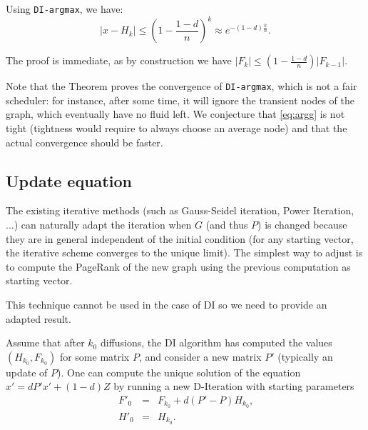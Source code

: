 \documentclass{llncs}
\begin{document}
\begin{theorem}
\label{thm:argmax}
Using \texttt{DI-argmax}, we have: 
\begin{equation}\label{eq:argg}
|x - H_k| \leq  \left(1-\frac{1-d}{n}\right)^k \approx e^{-(1-d)\frac k n}\text{.}
\end{equation}

\end{theorem}

The proof is immediate, as by construction we have $ |F_k|\leq (1-\frac{1-d}{n})|F_{k-1}| $.

Note that the Theorem proves the convergence of \texttt{DI-argmax}, which is not a fair scheduler: for instance, after some time, it will ignore the transient nodes of the graph, which eventually have no fluid left. We conjecture that \eqref{eq:argg} is not tight (tightness would require to always choose an average node) and that the actual convergence should be faster. 




\subsection{Update equation}

The existing iterative methods (such as Gauss-Seidel iteration, Power Iteration, ...) can naturally adapt the iteration when $ G $ (and thus $ P $) is changed because they are in general independent of the initial condition (for any starting vector, the iterative scheme converges to the unique limit). The simplest way to adjust is to compute the PageRank of the new graph using the previous computation as starting vector.

This technique cannot be used in the case of DI so we need to provide an adapted result.


\begin{theorem}
Assume that after $ k_0 $ diffusions, the DI algorithm has computed the values $ (H_{k_0},F_{k_0}) $ for some matrix $ P $, and consider a new matrix $ P'$ (typically an update of $ P $). One can compute the unique solution of the equation $ x'=dP'x'+(1-d)Z $ by running a new D-Iteration with starting parameters
\begin{eqnarray}
F'_0 &=& F_{k_0}+d(P'-P)H_{k_0}\text{,}\\
H'_0 &=& H_{k_0}\text{.}
\end{eqnarray}
\label{thm:update}
\end{theorem}
\end{document}
